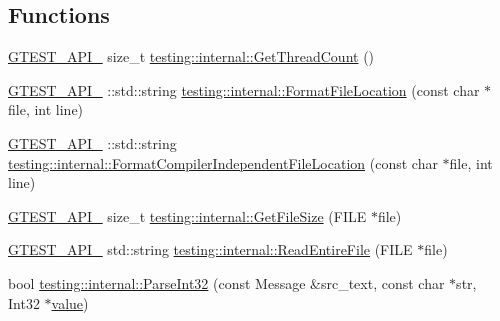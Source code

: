 \subsection*{Functions}
\begin{DoxyCompactItemize}
\item 
\mbox{\hyperlink{_obj__test_2lib_2googletest-release-1_88_81_2googletest_2include_2gtest_2internal_2gtest-port_8h_aa73be6f0ba4a7456180a94904ce17790}{G\+T\+E\+S\+T\+\_\+\+A\+P\+I\+\_\+}} size\+\_\+t \mbox{\hyperlink{namespacetesting_1_1internal_a3b9b3649cd04558bf46c75de52a7ef34}{testing\+::internal\+::\+Get\+Thread\+Count}} ()
\item 
\mbox{\hyperlink{_obj__test_2lib_2googletest-release-1_88_81_2googletest_2include_2gtest_2internal_2gtest-port_8h_aa73be6f0ba4a7456180a94904ce17790}{G\+T\+E\+S\+T\+\_\+\+A\+P\+I\+\_\+}} \+::std\+::string \mbox{\hyperlink{namespacetesting_1_1internal_a31b7c3abed4a7c395f42c61e993989f4}{testing\+::internal\+::\+Format\+File\+Location}} (const char $\ast$file, int line)
\item 
\mbox{\hyperlink{_obj__test_2lib_2googletest-release-1_88_81_2googletest_2include_2gtest_2internal_2gtest-port_8h_aa73be6f0ba4a7456180a94904ce17790}{G\+T\+E\+S\+T\+\_\+\+A\+P\+I\+\_\+}} \+::std\+::string \mbox{\hyperlink{namespacetesting_1_1internal_a1ee4cde97868c53e442d3182496a9f3c}{testing\+::internal\+::\+Format\+Compiler\+Independent\+File\+Location}} (const char $\ast$file, int line)
\item 
\mbox{\hyperlink{_obj__test_2lib_2googletest-release-1_88_81_2googletest_2include_2gtest_2internal_2gtest-port_8h_aa73be6f0ba4a7456180a94904ce17790}{G\+T\+E\+S\+T\+\_\+\+A\+P\+I\+\_\+}} size\+\_\+t \mbox{\hyperlink{namespacetesting_1_1internal_a06ca3f65f5e85c9ce7299b9e4cd52408}{testing\+::internal\+::\+Get\+File\+Size}} (F\+I\+LE $\ast$file)
\item 
\mbox{\hyperlink{_obj__test_2lib_2googletest-release-1_88_81_2googletest_2include_2gtest_2internal_2gtest-port_8h_aa73be6f0ba4a7456180a94904ce17790}{G\+T\+E\+S\+T\+\_\+\+A\+P\+I\+\_\+}} std\+::string \mbox{\hyperlink{namespacetesting_1_1internal_a2cc0be60c54a8701423fe5297e1349ee}{testing\+::internal\+::\+Read\+Entire\+File}} (F\+I\+LE $\ast$file)
\item 
bool \mbox{\hyperlink{namespacetesting_1_1internal_ac06fc81336a3d80755f4020d34321766}{testing\+::internal\+::\+Parse\+Int32}} (const Message \&src\+\_\+text, const char $\ast$str, Int32 $\ast$\mbox{\hyperlink{_obj__test_2lib_2googletest-master_2googlemock_2test_2gmock-matchers__test_8cc_a337b8a670efc0b086ad3af163f3121b6}{value}})

\end{DoxyCompactItemize}
